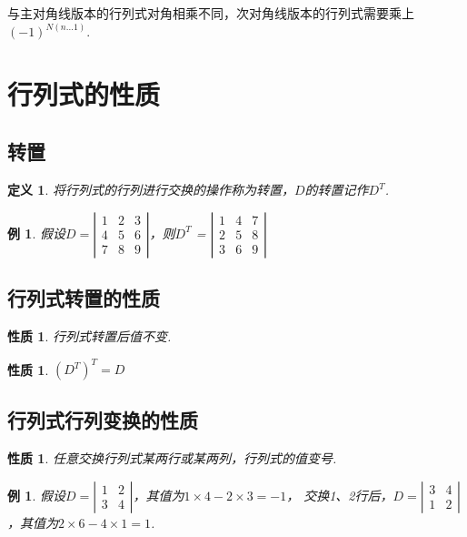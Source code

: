 \documentclass[12pt, a4paper, oneside]{ctexbook}
\newtheorem{definition}[theorem]{定义}
\newtheorem{example}[theorem]{例}
\newtheorem{quolity}[theorem]{性质}
\begin{document}
与主对角线版本的行列式对角相乘不同，次对角线版本的行列式需要乘上$(-1)^{N(n \dots 1)}$. 

\section{行列式的性质}
\subsection{转置}

\begin{definition}
    将行列式的行列进行交换的操作称为转置，$D$的转置记作$D^T$. 
\end{definition}

\begin{example}
    假设$D=\left | \begin{matrix}
        1 & 2 & 3 \\
        4 & 5 & 6 \\
        7 & 8 & 9
    \end{matrix} \right |$，则$D^T$ = $\left | \begin{matrix}
        1 & 4 & 7 \\
        2 & 5 & 8 \\
        3 & 6 & 9
    \end{matrix} \right |$
\end{example}

\subsection{行列式转置的性质}

\begin{quolity}
    行列式转置后值不变. 
\end{quolity}

\begin{quolity}
    $(D^T)^T = D$
\end{quolity}

\subsection{行列式行列变换的性质}

\begin{quolity}
    任意交换行列式某两行或某两列，行列式的值变号. 
\end{quolity}

\begin{example}
    假设$D=\left | \begin{matrix}
        1 & 2 \\
        3 & 4
    \end{matrix} \right |$，其值为$1 \times 4 - 2 \times 3 = -1$，
    交换1、2行后，$D=\left | \begin{matrix}
        3 & 4 \\
        1 & 2
    \end{matrix} \right |$，其值为$2 \times 6 - 4 \times 1 = 1$. 
\end{example}
\end{document}
